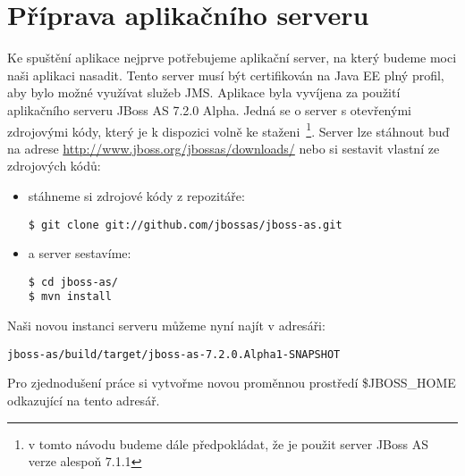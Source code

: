 \documentclass[122pt,oneside]{fithesis}
\begin{document}
\section{Příprava aplikačního serveru}
Ke spuštění aplikace nejprve potřebujeme aplikační server, na který budeme moci naši aplikaci nasadit. Tento server musí být certifikován na Java EE plný profil, aby bylo možné využívat služeb JMS. Aplikace byla vyvíjena za použití aplikačního serveru JBoss AS 7.2.0 Alpha. Jedná se o server s otevřenými zdrojovými kódy, který je k dispozici volně ke staženi~\footnote{v tomto návodu budeme dále předpokládat, že je použit server JBoss AS verze alespoň 7.1.1}. Server lze stáhnout buď na adrese \href{http://www.jboss.org/jbossas/downloads/}{http://www.jboss.org/jbossas/downloads/} nebo si sestavit vlastní ze zdrojových kódů:
\begin{itemize}
  \item stáhneme si zdrojové kódy z repozitáře:
\begin{lstlisting}
$ git clone git://github.com/jbossas/jboss-as.git
\end{lstlisting}
  \item a server sestavíme:
\begin{lstlisting}
$ cd jboss-as/
$ mvn install
\end{lstlisting}
\end{itemize}
Naši novou instanci serveru můžeme nyní najít v adresáři: 
\begin{lstlisting}
jboss-as/build/target/jboss-as-7.2.0.Alpha1-SNAPSHOT
\end{lstlisting}
Pro zjednodušení práce si vytvořme novou proměnnou prostředí \$JBOSS\_HOME odkazující na tento adresář.
\end{document}
